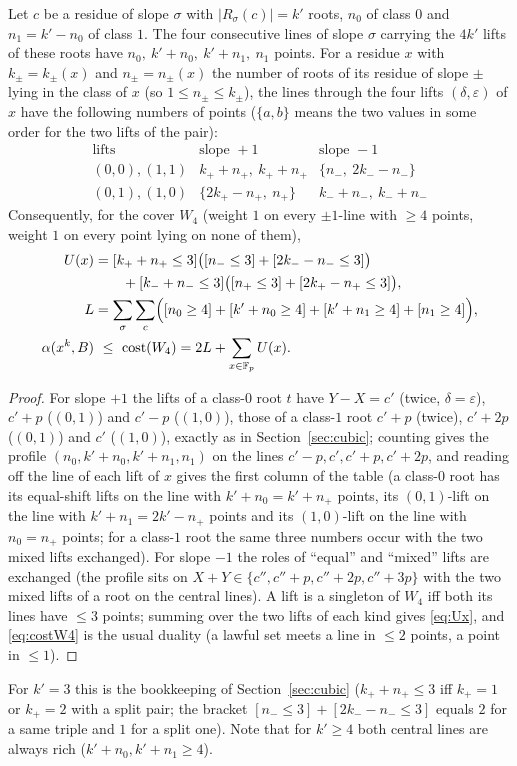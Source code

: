 \begin{lemma}\label{lem:lifts}
Let $c$ be a residue of slope $\sigma$ with $|R_\sigma(c)|=k'$ roots, $n_0$ of class $0$ and $n_1=k'-n_0$ of class $1$.  The four consecutive lines of slope
$\sigma$ carrying the $4k'$ lifts of these roots have $n_0,\ k'+n_0,\ k'+n_1,\ n_1$ points.  For a residue $x$ with $k_\pm=k_\pm(x)$ and $n_\pm=n_\pm(x)$
the number of roots of its residue of slope $\pm$ lying in the class of $x$ (so $1\le n_\pm\le k_\pm$), the lines through the four lifts
$(\delta,\varepsilon)$ of $x$ have the following numbers of points ($\{a,b\}$ means the two values in some order for the two lifts of the pair):
\[
\begin{array}{c|c|c}
\text{lifts} & \text{slope }+1 & \text{slope }-1\\ \hline
(0,0),(1,1) & k_++n_+,\ k_++n_+ & \{n_-,\ 2k_--n_-\}\\
(0,1),(1,0) & \{2k_+-n_+,\ n_+\} & k_-+n_-,\ k_-+n_-
\end{array}
\]
Consequently, for the cover $W_4$ (weight $1$ on every $\pm1$-line with $\ge4$ points, weight $1$ on every point lying on none of them),
\begin{align}
 U(x)&=[k_++n_+\le3]\bigl([n_-\le3]+[2k_--n_-\le3]\bigr)\notag\\
 &\qquad+[k_-+n_-\le3]\bigl([n_+\le3]+[2k_+-n_+\le3]\bigr),\label{eq:Ux}\\
 L&=\sum_\sigma\sum_c\Bigl([n_0\ge4]+[k'+n_0\ge4]+[k'+n_1\ge4]+[n_1\ge4]\Bigr),\label{eq:Lperm}\\
 \alpha(x^k,B)&\ \le\ \mathrm{cost}(W_4)=2L+\sum_{x\in\Fp}U(x).\label{eq:costW4}
\end{align}
\end{lemma}
\begin{proof}
For slope $+1$ the lifts of a class-$0$ root $t$ have $Y-X=c'$ (twice, $\delta=\varepsilon$), $c'+p$ ($(0,1)$) and $c'-p$ ($(1,0)$), those of a class-$1$ root
$c'+p$ (twice), $c'+2p$ ($(0,1)$) and $c'$ ($(1,0)$), exactly as in Section~\ref{sec:cubic}; counting gives the profile $(n_0,k'+n_0,k'+n_1,n_1)$ on the lines
$c'-p,c',c'+p,c'+2p$, and reading off the line of each lift of $x$ gives the first column of the table (a class-$0$ root has its equal-shift lifts on the
line with $k'+n_0=k'+n_+$ points, its $(0,1)$-lift on the line with $k'+n_1=2k'-n_+$ points and its $(1,0)$-lift on the line with $n_0=n_+$ points; for a
class-$1$ root the same three numbers occur with the two mixed lifts exchanged).  For slope $-1$ the roles of ``equal'' and ``mixed'' lifts are exchanged
(the profile sits on $X+Y\in\{c'',c''+p,c''+2p,c''+3p\}$ with the two mixed lifts of a root on the central lines).  A lift is a singleton of $W_4$ iff both its
lines have $\le3$ points; summing over the two lifts of each kind gives \eqref{eq:Ux}, and \eqref{eq:costW4} is the usual duality (a lawful set meets a line
in $\le2$ points, a point in $\le1$).
\end{proof}
For $k'=3$ this is the bookkeeping of Section~\ref{sec:cubic} ($k_++n_+\le3$ iff $k_+=1$ or $k_+=2$ with a split pair; the bracket $[n_-\le3]+[2k_--n_-\le3]$
equals $2$ for a same triple and $1$ for a split one).  Note that for $k'\ge4$ both central lines are always rich ($k'+n_0,k'+n_1\ge4$).

